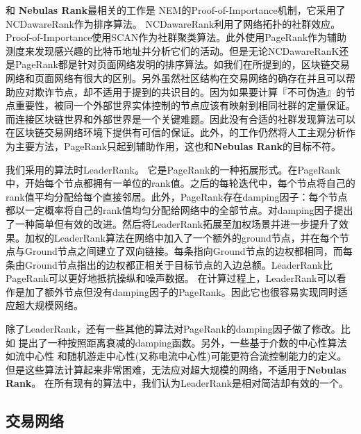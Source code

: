 和 \textbf{Nebulas Rank}最相关的工作是 NEM\cite{nem}的Proof-of-Importance机制，它采用了 NCDawareRank\cite{Nikolakopoulos2013}作为排序算法。 NCDawareRank\cite{Nikolakopoulos2013}利用了网络拓扑的社群效应。Proof-of-Importance使用SCAN\cite{xu2007scan}\cite{shiokawa2015scan}\cite{chang2017mathsf}作为社群聚类算法。此外\textcite{Fleder2015}使用PageRank\cite{Brin2010}\cite{page1999pagerank}作为辅助测度来发现感兴趣的比特币地址并分析它们的活动。但是无论NCDawareRanK还是PageRank都是针对页面网络发明的排序算法。如我们在所提到的，区块链交易网络和页面网络有很大的区别。另外虽然社区结构在交易网络的确存在并且可以帮助应对欺诈节点，却不适用于提到的共识目的。因为如果要计算『不可伪造』的节点重要性，被同一个外部世界实体控制的节点应该有映射到相同社群的定量保证。而连接区块链世界和外部世界是一个关键难题。因此没有合适的社群发现算法可以在区块链交易网络环境下提供有可信的保证。此外，\cite{Fleder2015}的工作仍然将人工主观分析作为主要方法，PageRank只起到辅助作用，这也和\textbf{Nebulas Rank}的目标不符。

我们采用的算法时LeaderRank\cite{Chen2013}\cite{Li2014}。 它是PageRank\cite{Brin2010}\cite{page1999pagerank}的一种拓展形式。在PageRank中，开始每个节点都拥有一单位的rank值。之后的每轮迭代中，每个节点将自己的rank值平均分配给每个直接邻居。此外，PageRank存在damping因子：每个节点都以一定概率将自己的rank值均匀分配给网络中的全部节点。\textcite{Chen2013}对damping因子提出了一种简单但有效的改进。然后\textcite{Li2014}将LeaderRank拓展至加权场景并进一步提升了效果。加权的LeaderRank算法在网络中加入了一个额外的ground节点，并在每个节点与Ground节点之间建立了双向链接。每条指向Ground节点的边权都相同，而每条由Ground节点指出的边权都正相关于目标节点的入边总额。LeaderRank比PageRank可以更好地抵抗操纵和噪声数据\cite{Chen2013}\cite{Li2014}\cite{Lu2016}。 在计算过程上，LeaderRank可以看作是加了额外节点但没有damping因子的PageRank。因此它也很容易实现同时适应超大规模网络。

除了LeaderRank，还有一些其他的算法对PageRank的damping因子做了修改。比如\textcite{Baeza-Yates2006} 提出了一种按照距离衰减的damping函数。另外，一些基于介数的中心性算法如流中心性\cite{freeman1991centrality} 和随机游走中心性(又称电流中心性)\cite{newman2005measure}可能更符合流控制能力的定义。但是这些算法计算起来非常困难，无法应对超大规模的网络，不适用于\textbf{Nebulas Rank}。 在所有现有的算法中，我们认为LeaderRank是相对简洁却有效的一个。

\subsection{交易网络} \label{sec:txg}

